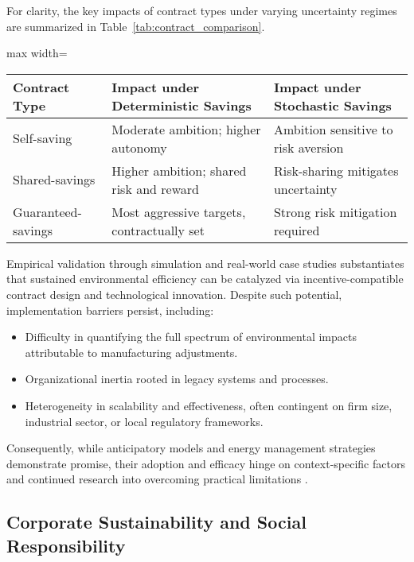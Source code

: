 For clarity, the key impacts of contract types under varying uncertainty regimes are summarized in Table~\ref{tab:contract_comparison}.

\begin{table*}[htbp]
\centering
\caption{Impacts of Contract Type and Uncertainty on Manufacturer Energy-Saving Decisions}
\label{tab:contract_comparison}
\begin{adjustbox}{max width=\textwidth}
\begin{tabular}{lll}
\toprule
\textbf{Contract Type} & \textbf{Impact under Deterministic Savings} & \textbf{Impact under Stochastic Savings} \\
\midrule
Self-saving            & Moderate ambition; higher autonomy          & Ambition sensitive to risk aversion      \\
Shared-savings         & Higher ambition; shared risk and reward     & Risk-sharing mitigates uncertainty       \\
Guaranteed-savings     & Most aggressive targets, contractually set  & Strong risk mitigation required          \\
\bottomrule
\end{tabular}
\end{adjustbox}
\end{table*}

Empirical validation through simulation and real-world case studies substantiates that sustained environmental efficiency can be catalyzed via incentive-compatible contract design and technological innovation. Despite such potential, implementation barriers persist, including:

\begin{itemize}
    \item Difficulty in quantifying the full spectrum of environmental impacts attributable to manufacturing adjustments.
    \item Organizational inertia rooted in legacy systems and processes.
    \item Heterogeneity in scalability and effectiveness, often contingent on firm size, industrial sector, or local regulatory frameworks.
\end{itemize}

Consequently, while anticipatory models and energy management strategies demonstrate promise, their adoption and efficacy hinge on context-specific factors and continued research into overcoming practical limitations \cite{ref80}.

\subsection{Corporate Sustainability and Social Responsibility}


